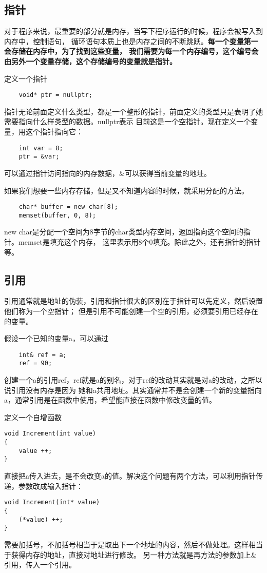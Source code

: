\documentclass{article}
\begin{document}
\begin{sloppypar}
\subsection{指针}
对于程序来说，最重要的部分就是内存，当写下程序运行的时候，程序会被写入到内存中，控制语句，
循环语句本质上也是内存之间的不断跳跃。\textbf{每一个变量第一会存储在内存中，为了找到这些变量，
我们需要为每一个内存编号，这个编号会由另外一个变量存储，这个存储编号的变量就是指针。}

定义一个指针
\begin{lstlisting}
	void* ptr = nullptr;
\end{lstlisting}
指针无论前面定义什么类型，都是一个整形的指针，前面定义的类型只是表明了她需要指向什么样类型的数据。nullptr表示
目前这是一个空指针。现在定义一个变量，用这个指针指向它：
\begin{lstlisting}
	int var = 8;
	ptr = &var;
\end{lstlisting}

\*可以通过指针访问指向的内存数据，\&可以获得当前变量的地址。

如果我们想要一些内存存储，但是又不知道内容的时候，就采用分配的方法。
\begin{lstlisting}
    char* buffer = new char[8];
    memset(buffer, 0, 8);
\end{lstlisting}
new char是分配一个空间为8字节的char类型内存空间，返回指向这个空间的指针。memset是填充这个内存，
这里表示用8个0填充。除此之外，还有指针的指针等。

\subsection{引用}
引用通常就是地址的伪装，引用和指针很大的区别在于指针可以先定义，然后设置他们称为一个空指针；
但是引用不可能创建一个空的引用，必须要引用已经存在的变量。 

假设一个已知的变量a，可以通过
\begin{lstlisting}
	int& ref = a;
    ref = 90;
\end{lstlisting}
创建一个a的引用ref，ref就是a的别名，对于ref的改动其实就是对a的改动，之所以说引用没有内存是因为
她和a共用地址。其实通常并不是会创建一个新的变量指向a，通常引用是在函数中使用，希望能直接在函数中修改变量的值。  

定义一个自增函数
\begin{lstlisting}
void Increment(int value)
{
    value ++;
}
\end{lstlisting}
直接把a传入进去，是不会改变a的值。解决这个问题有两个方法，可以利用指针传递，参数改成输入指针：
\begin{lstlisting}
void Increment(int* value)
{
    (*value) ++;
}
\end{lstlisting}
需要加括号，不加括号相当于是取出下一个地址的内容，然后不做处理。这样相当于获得内存的地址，直接对地址进行修改。
另一种方法就是再方法的参数加上\&引用，传入一个引用。


\end{sloppypar}
\end{document}
